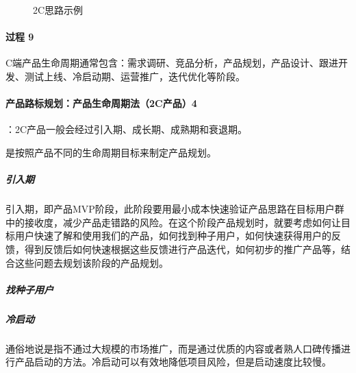 \documentclass[letterpaper,11pt,english]{sphinxmanual}
\begin{document}
\begin{figure}[H]
\centering
\capstart

\noindent{}
\caption{2C思路示例}\label{\detokenize{chapter_introduction/2C:id27}}\end{figure}


\paragraph{过程 9\sphinxfootnotemark[82]}
\label{\detokenize{chapter_introduction/2C:id12}}%
\begin{footnotetext}[82]\sphinxAtStartFootnote
{}
%
\end{footnotetext}\ignorespaces 
C端产品生命周期通常包含：需求调研、竞品分析，产品规划，产品设计、跟进开发、测试上线、冷启动期、运营推广，迭代优化等阶段。


\paragraph{产品路标规划：产品生命周期法（2C产品）4\sphinxfootnotemark[83]}
\label{\detokenize{chapter_introduction/2C:c-4}}%
\begin{footnotetext}[83]\sphinxAtStartFootnote
{}
%
\end{footnotetext}\ignorespaces 
{}：2C产品一般会经过引入期、成长期、成熟期和衰退期。
\begin{center}\end{center}

是按照产品不同的生命周期目标来制定产品规划。


\subparagraph{引入期}
\label{\detokenize{chapter_introduction/2C:id13}}
引入期，即产品MVP阶段，此阶段要用最小成本快速验证产品思路在目标用户群中的接收度，减少产品走错路的风险。在这个阶段产品规划时，就要考虑如何让目标用户快速了解和使用我们的产品，如何找到种子用户，如何快速获得用户的反馈，得到反馈后如何快速根据这些反馈进行产品迭代，如何初步的推广产品等，结合这些问题去规划该阶段的产品规划。


\subparagraph{找种子用户}
\label{\detokenize{chapter_introduction/2C:id14}}

\subparagraph{冷启动}
\label{\detokenize{chapter_introduction/2C:id15}}
%
\begin{footnote}[84]\sphinxAtStartFootnote
{}
%
\end{footnote}通俗地说是指不通过大规模的市场推广，而是通过优质的内容或者熟人口碑传播进行产品启动的方法。冷启动可以有效地降低项目风险，但是启动速度比较慢。
\end{document}
